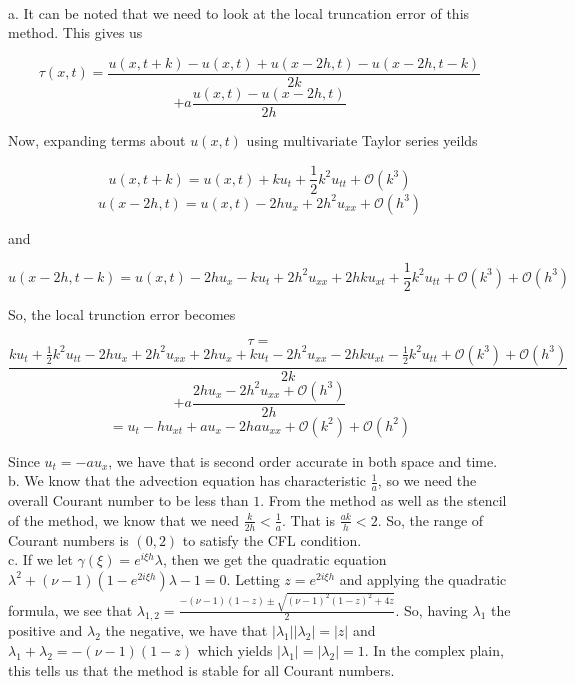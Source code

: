 \begin{solution}\renewcommand{\qedsymbol}{}\ \\
    a. It can be noted that we need to look at the local truncation error of this method. This gives us

    $$\tau(x,t)=\frac{u(x,t+k)-u(x,t)+u(x-2h,t)-u(x-2h,t-k)}{2k}$$
    $$+a\frac{u(x,t)-u(x-2h,t)}{2h}$$

    Now, expanding terms about $u(x,t)$ using multivariate Taylor series yeilds

    $$u(x,t+k)=u(x,t)+ku_t+\frac12k^2u_{tt}+\mathcal{O}(k^3)$$
    $$u(x-2h,t)=u(x,t)-2hu_x+2h^2u_{xx}+\mathcal{O}(h^3)$$

    and

    $$u(x-2h,t-k)=u(x,t)-2hu_x-ku_t+2h^2u_{xx}+2hku_{xt}+\frac12k^2u_{tt}+\mathcal{O}(k^3)
    +\mathcal{O}(h^3)$$
    
    So, the local trunction error becomes

    $$\tau=$$
    $$\frac{ku_t+\frac12k^2u_{tt}-2hu_x+2h^2u_{xx}+2hu_x+ku_t-2h^2u_{xx}-2hku_{xt}-\frac12k^2u_{tt}
    +\mathcal{O}(k^3)+\mathcal{O}(h^3)}{2k}$$
    $$+a\frac{2hu_x-2h^2u_{xx}+\mathcal{O}(h^3)}{2h}$$
    $$=u_t-hu_{xt}+au_x-2hau_{xx}+\mathcal{O}(k^2)+\mathcal{O}(h^2)$$

    Since $u_t=-au_x$, we have that is second order accurate in both space and time.\\

    b. We know that the advection equation has characteristic $\frac1a$, so we need the overall Courant
    number to be less than $1$. From the method as well as the stencil of the method, we know that we
    need $\frac{k}{2h}<\frac1a$. That is $\frac{ak}{h}<2$. So, the range of Courant numbers is $(0,2)$
    to satisfy the CFL condition.\\

    c. If we let $\gamma(\xi)=e^{i\xi h}\lambda$, then we get the quadratic equation
    $\lambda^2+(\nu-1)(1-e^{2i\xi h})\lambda-1=0$. Letting $z=e^{2i\xi h}$ and applying the quadratic
    formula, we see that $\lambda_{1,2}=\frac{-(\nu-1)(1-z)\pm\sqrt{(\nu-1)^2(1-z)^2+4z}}{2}$. So,
    having $\lambda_1$ the positive and $\lambda_2$ the negative, we have that
    $|\lambda_1||\lambda_2|=|z|$ and $\lambda_1+\lambda_2=-(\nu-1)(1-z)$ which yields
    $|\lambda_1|=|\lambda_2|=1$. In the complex plain, this tells us that the method is stable for all
    Courant numbers.

\end{solution}